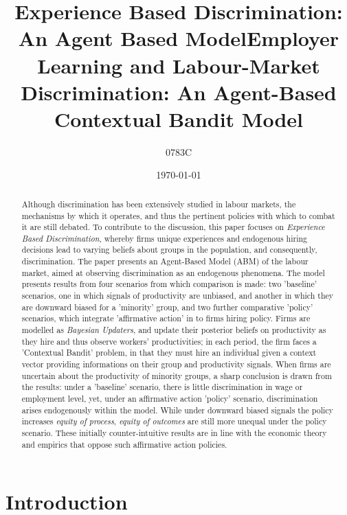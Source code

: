 \documentclass[]{article}
\title{Experience Based Discrimination: An Agent Based Model}
\author{}
\begin{document}
\title{Employer Learning and Labour-Market Discrimination: An Agent-Based Contextual Bandit Model} %
\author{0783C}
\date{\today}
\maketitle

\let\thefootnote\relax
{} %

\begin{abstract}
Although discrimination has been extensively studied in labour markets, the mechanisms by which it operates, and thus the pertinent policies with which to combat it are still debated. To contribute to the discussion, this paper focuses on \textit{Experience Based Discrimination}, whereby firms unique experiences and endogenous hiring decisions lead to varying beliefs about groups in the population, and consequently, discrimination. The paper presents an Agent-Based Model (ABM) of the labour market, aimed at observing discrimination as an endogenous phenomena. The model presents results from four scenarios from which comparison is made: two 'baseline' scenarios, one in which signals of productivity are unbiased, and another in which they are downward biased for a 'minority' group, and two further comparative 'policy' scenarios, which integrate 'affirmative action' in to firms hiring policy. Firms are modelled as \textit{Bayesian Updaters}, and update their posterior beliefs on productivity as they hire and thus observe workers' productivities; in each period, the firm faces a 'Contextual Bandit' problem, in that they must hire an individual given a context vector providing informations on their group and productivity signals. When firms are uncertain about the productivity of minority groups, a sharp conclusion is drawn from the results: under a 'baseline' scenario, there is little discrimination in wage or employment level, yet, under an affirmative action 'policy' scenario, discrimination arises endogenously within the model. While under downward biased signals the policy increases \textit{equity of process}, \textit{equity of outcomes} are still more unequal under the policy scenario. These initially counter-intuitive results are in line with the economic theory and empirics that oppose such affirmative action policies.
\end{abstract} %


\newpage
\section{Introduction}
\end{document}
